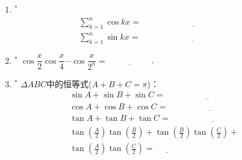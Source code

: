 \documentclass{article}
\newif\ifte
\begin{document}
\begin{multicols}{2}
\begin{enumerate}[leftmargin=20pt]
\item $^*$ 
\begin{align*}
    &\sum_{k=1}^{n}\cos kx=\underline{\ \ifte 
    \dfrac{\sin\left( n+\dfrac{1}{2}\right) x-\sin 
        \dfrac{x}{2}}{2\sin \dfrac{x}{2}}    
        \else \hspace{5cm} \fi\ }  \\
    &\sum_{k=1}^{n}\sin kx=\underline{\ \ifte 
        \dfrac{-\cos\left( n+\dfrac{1}{2}\right) x+\cos 
        \dfrac{x}{2}}{2\sin \dfrac{x}{2}}
        \else \hspace{5cm} \fi\ }
\end{align*}

\item $^*$ $ \cos\dfrac{x}{2} \cos\dfrac{x}{4}\cdots\cos\dfrac{x}{2^n}
=\underline{\ \ifte \dfrac{\sin x}{2^n \sin\dfrac{x}{2^n}}
    \else \hspace{2cm} \fi\ } $.

\item $^*$ $ \Delta ABC $中的恒等式($ A+B+C=\pi $)：
\begin{align*} 
    &\sin A +\sin B +\sin C =\underline{\ \ifte 
        4\cos\left(\tfrac{A}{2}\right)\cos\left(\tfrac{B}{2}\right)
        \cos\left(\tfrac{C}{2}\right)\else \hspace{4cm} \fi\ }  \\
    &\cos A +\cos B +\cos C =\underline{\ \ifte 
        1+4\sin\left(\tfrac{A}{2}\right)\sin\left(\tfrac{B}{2}\right)
        \sin\left(\tfrac{C}{2}\right)\else \hspace{4cm} \fi\ }  \\
    &\tan A+\tan B +\tan C =\underline{\ \ifte 
        \tan A \tan B\tan C \else \hspace{4cm} \fi\ } \\
    &\tan\left(\tfrac{A}{2}\right)\tan\left(\tfrac{B}{2}\right)+
    \tan\left(\tfrac{B}{2}\right)\tan\left(\tfrac{C}{2}\right)+\\
    &\tan\left(\tfrac{A}{2}\right)\tan\left(\tfrac{C}{2}\right)=
    \underline{\ \ifte 1\else \hspace{1cm} \fi\ } 
\end{align*}


\end{enumerate}
\end{multicols}
\end{document}
